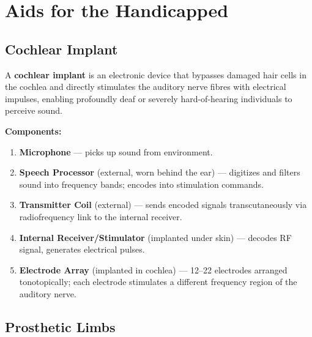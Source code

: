 \documentclass[12pt,a4paper]{article}
\begin{document}
\section{Aids for the Handicapped}

\subsection{Cochlear Implant}

\begin{tcolorbox}[defbox, title={\textbf{Cochlear Implant}}]
A \textbf{cochlear implant} is an electronic device that bypasses damaged hair cells in the cochlea and directly stimulates the auditory nerve fibres with electrical impulses, enabling profoundly deaf or severely hard-of-hearing individuals to perceive sound.
\end{tcolorbox}

\textbf{Components:}
\begin{enumerate}[leftmargin=*, itemsep=3pt]
  \item \textbf{Microphone} --- picks up sound from environment.
  \item \textbf{Speech Processor} (external, worn behind the ear) --- digitizes and filters sound into frequency bands; encodes into stimulation commands.
  \item \textbf{Transmitter Coil} (external) --- sends encoded signals transcutaneously via radiofrequency link to the internal receiver.
  \item \textbf{Internal Receiver/Stimulator} (implanted under skin) --- decodes RF signal, generates electrical pulses.
  \item \textbf{Electrode Array} (implanted in cochlea) --- 12--22 electrodes arranged tonotopically; each electrode stimulates a different frequency region of the auditory nerve.
\end{enumerate}

\subsection{Prosthetic Limbs}
\end{document}

